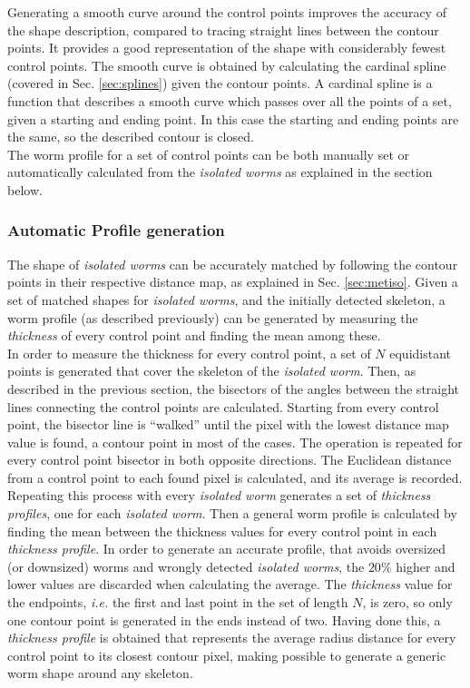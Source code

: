 Generating a smooth curve around the control points improves the accuracy of the shape
description, compared to tracing straight lines
between the contour points. It provides a good representation
of the shape with considerably fewest control points. The smooth curve
is obtained by calculating the cardinal spline (covered in Sec. \ref{sec:splines}) given the
contour points. A cardinal spline is a function that describes a smooth curve
which passes over all the points of a set, given a starting and ending point. 
In this case
the starting and ending points are the same, so the described contour is closed.\\

The worm profile for a set of control points can be both manually set or automatically
calculated from the \emph{isolated worms} as explained in the section below.

\subsubsection{Automatic Profile generation}
\label{sec:metwormprof}

The shape of \emph{isolated worms}  can be accurately matched
by following the contour points in their respective distance map, as explained 
in Sec. \ref{sec:metiso}. Given a set of matched shapes for \emph{isolated worms}, and
the initially detected skeleton, a worm profile (as described previously) can be 
generated by measuring the \emph{thickness} of every control point and finding the mean
among these.\\

In order to measure the thickness for every control point, a set of
$N$ equidistant points is generated that cover the skeleton of the \emph{isolated worm}.
Then, as described in the previous section, the bisectors of the angles between the 
straight lines connecting the control points are calculated. Starting from every control
point, the bisector line is ``walked'' until the pixel with the lowest distance map
value is found, a contour point in most of the cases. The operation is repeated for every 
control point bisector in both opposite directions. The Euclidean distance from a control
point to each found pixel is calculated, and its average is recorded. Repeating this process
with every \emph{isolated worm} generates a set of \emph{thickness profiles}, one for each
\emph{isolated worm}. Then a general worm profile is calculated by finding the mean between
the thickness values for every control point in each \emph{thickness profile}. In order 
to generate an accurate profile, that avoids oversized (or downsized) worms and wrongly
detected \emph{isolated worms}, the $20\%$ higher and lower values are discarded when 
calculating the average. The \emph{thickness} value for
the endpoints, \emph{i.e.} the first and last point in the set of length $N$, is zero,
so only one contour point is generated in the ends instead of two.
Having done this, a \emph{thickness profile} is obtained that represents the average 
radius distance for every control point to its closest contour pixel, making possible
to generate a generic worm shape around any skeleton. 

